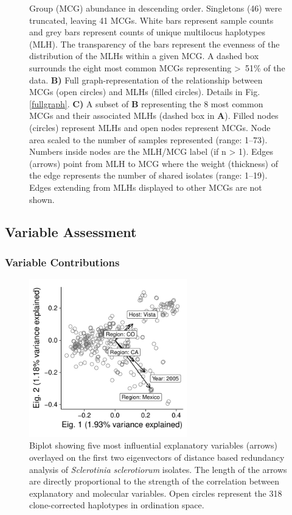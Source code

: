 \documentclass[fleqn,10pt,lineno]{wlpeerj} %
\theoremstyle{definition}
\theoremstyle{definition}
\theoremstyle{definition}
\theoremstyle{remark}
\begin{document}
\begin{figure}
{Group (MCG) abundance in descending order. Singletons (46) were
truncated, leaving 41 MCGs. White bars represent sample counts and grey
bars represent counts of unique multilocus haplotypes (MLH). The
transparency of the bars represent the evenness of the distribution of
the MLHs within a given MCG. A dashed box surrounds the eight most
common MCGs representing \textgreater{}~51\% of the data. \textbf{B)}
Full graph-representation of the relationship between MCGs (open
circles) and MLHs (filled circles). Details in Fig. \ref{fullgraph}.
\textbf{C)} A subset of \textbf{B} representing the 8 most common MCGs
and their associated MLHs (dashed box in \textbf{A}). Filled nodes
(circles) represent MLHs and open nodes represent MCGs. Node area scaled
to the number of samples represented (range: 1--73). Numbers inside
nodes are the MLH/MCG label (if n \textgreater{} 1). Edges (arrows)
point from MLH to MCG where the weight (thickness) of the edge
represents the number of shared isolates (range: 1--19). Edges extending
from MLHs displayed to other MCGs are not shown.}\label{biggraph}
\end{figure}

\subsection*{Variable Assessment}\label{variable-assessment}

\subsubsection*{Variable Contributions}\label{variable-contributions}

\begin{figure}
\centering
\includegraphics[width=0.61000\textwidth]{../../results/figures/publication/Figure7Z.pdf}
\caption{Biplot showing five most influential explanatory variables
(arrows) overlayed on the first two eigenvectors of distance based
redundancy analysis of \emph{Sclerotinia sclerotiorum} isolates. The
length of the arrows are directly proportional to the strength of the
correlation between explanatory and molecular variables. Open circles
represent the 318 clone-corrected haplotypes in ordination
space.}\label{rda-biplot}
\end{figure}
\end{document}
